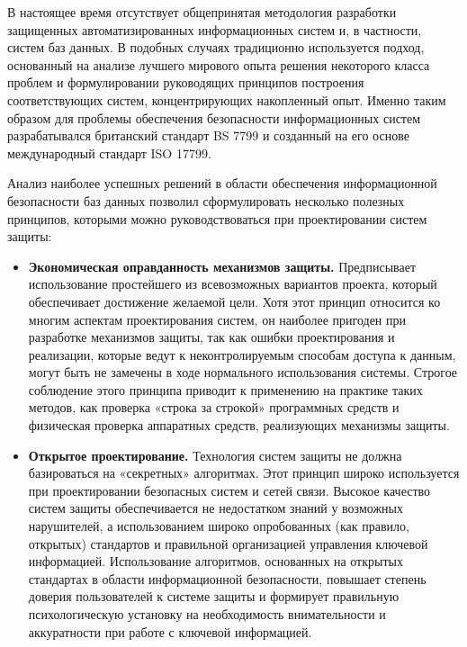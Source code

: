 В настоящее время отсутствует общепринятая методология разработки защищенных
автоматизированных информационных систем и, в частности, систем баз данных. В подобных
случаях традиционно используется подход, основанный на анализе лучшего мирового опыта
решения некоторого класса проблем и формулировании руководящих принципов построения
соответствующих систем, концентрирующих накопленный опыт. Именно таким образом для проблемы
обеспечения безопасности информационных систем разрабатывался британский стандарт BS 7799
и созданный на его основе международный стандарт ISO 17799.

Анализ наиболее успешных решений в области обеспечения информационной безопасности баз данных
позволил сформулировать несколько полезных принципов, которыми можно руководствоваться
при проектировании систем защиты:
\begin{itemize}
	\item \textbf{Экономическая оправданность механизмов защиты.}
        Предписывает использование простейшего из всевозможных вариантов проекта, который
        обеспечивает достижение желаемой цели. Хотя этот принцип относится ко многим аспектам
        проектирования систем, он наиболее пригоден при разработке механизмов защиты, так как
        ошибки проектирования и реализации, которые ведут к неконтролируемым способам доступа
        к данным, могут быть не замечены в ходе нормального использования системы. Строгое
        соблюдение этого принципа приводит к применению на практике таких методов, как проверка
        «строка за строкой» программных средств и физическая проверка аппаратных средств,
        реализующих механизмы защиты.

    \item \textbf{Открытое проектирование.}
        Технология систем защиты не должна базироваться на «секретных» алгоритмах. Этот принцип
        широко используется при проектировании безопасных систем и сетей связи. Высокое качество
        систем защиты обеспечивается не недостатком знаний у возможных нарушителей,
        а использованием широко опробованных (как правило, открытых) стандартов и правильной
        организацией управления ключевой информацией. Использование алгоритмов, основанных на
        открытых стандартах в области информационной безопасности, повышает степень доверия
        пользователей к системе защиты и формирует правильную психологическую установку на
        необходимость внимательности и аккуратности при работе с ключевой информацией.


\end{itemize}
